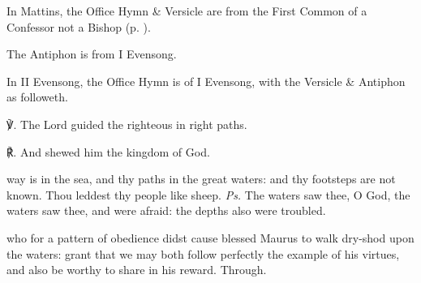
\begin{rubric}
	In Mattins, the Office Hymn \& Versicle are from the First Common of a Confessor not a Bishop (p. \pageref{CommonConfessorNotBishopI}).\par
	The Antiphon is from I Evensong.
\end{rubric}

\begin{rubric}
	In II Evensong, the Office Hymn is of I Evensong, with the Versicle \& Antiphon as followeth.
\end{rubric}

℣. The Lord guided the righteous in right paths.

℟. And shewed him the kingdom of God.\\


\introit
{} way is in the sea, and thy paths in the great waters: and thy footsteps are not known. Thou leddest thy people like sheep. \textit{Ps.} The waters saw thee, O God, the waters saw thee, and were afraid: the depths also were troubled.

\collect
{} who for a pattern of obedience didst cause blessed Maurus to walk dry-shod upon the waters: grant that we may both follow perfectly the example of his virtues, and also be worthy to share in his reward. Through.

